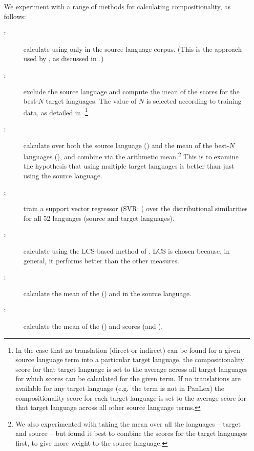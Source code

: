 \documentclass[output=paper,modfonts,nonflat]{langsci/langscibook}
\begin{document}
We experiment with a range of methods for calculating
compositionality, as follows:
\begin{description}
\item[\CSsource:] calculate  using only
   in the source language corpus. (This is
  the approach used by \citet{reddy2011a}, as discussed in .)
\item[\CStarg:] exclude the source language and compute the mean of
  the  scores for the best-$N$ target
  languages. The value of $N$ is selected according to training data,
  as detailed in .\footnote{In the case
    that no translation (direct or indirect) can be found for a given
    source language term into a particular target language, the
    compositionality score for that target language is set to the
    average across all target languages for which scores can be
    calculated for the given term. If no translations are available
    for any target language (e.g.\ the term is not in PanLex) the
    compositionality score for each target language is set to the
    average score for that target language across all other source
    language terms.}
\item[\CSsourcetarg:] calculate  over both the
  source language (\CSsource) and the mean of the best-$N$ languages
  (\CStarg), and combine via the arithmetic mean.\footnote{We also
    experimented with taking the mean over all the languages -- target
    and source -- but found it best to combine the scores for the
    target languages first, to give more weight to the source language.}
  This is to examine the hypothesis that using multiple target languages
  is better than just using the source language.
\item[\CSsvr:] train a support vector regressor (SVR:
  \citet{Smola:Scholkopf:2004}) over the distributional similarities
  for all 52 languages (source and target languages).
\item[\CSstring:] calculate  using the LCS-based method
  of . 
	LCS is chosen because, in general, it performs better than 
	the other  measures.
\item[\CSstringDS:] calculate the mean of the  (\CSstring)
  and  in the source language.
\item[\CSall:] calculate the mean of the  (\CSstring)
  and  scores (\CSsource and \CStarg).
\end{description}
\end{document}
